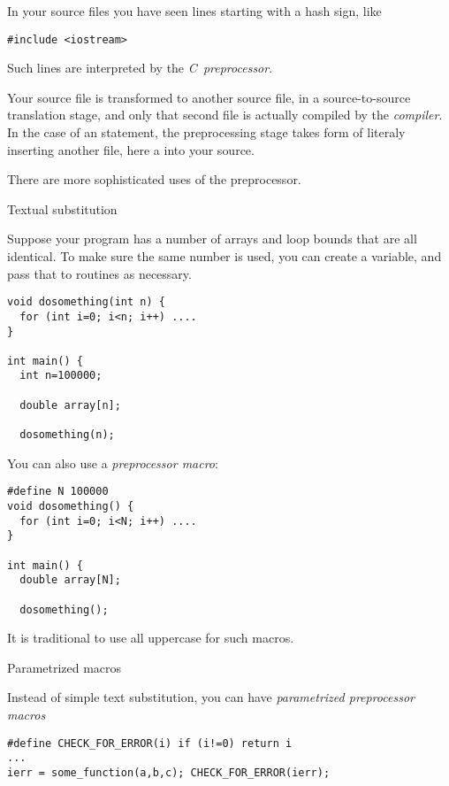 
In your source files you have seen lines starting with a hash sign,
like
\begin{lstlisting}
#include <iostream>
\end{lstlisting}
Such lines are interpreted by the
%
\emph{C~preprocessor}.

Your source file is transformed to another source file, in a
source-to-source translation stage, and only that second file is
actually compiled by the
%
\emph{compiler}.
In the case of an  statement, the preprocessing stage
takes form of literaly inserting another file, here a
%
into your source.

There are more sophisticated uses of the preprocessor.

 {Textual substitution}

Suppose your program has a number of arrays and loop bounds that are
all identical. To make sure the same number is used, you can create a
variable, and pass that to routines as necessary.
\begin{lstlisting}
void dosomething(int n) {
  for (int i=0; i<n; i++) ....
}

int main() {
  int n=100000;

  double array[n];
   
  dosomething(n);
\end{lstlisting}
You can also use a \emph{preprocessor macro}:
\begin{lstlisting}
#define N 100000
void dosomething() {
  for (int i=0; i<N; i++) ....
}

int main() {
  double array[N];
   
  dosomething();
\end{lstlisting}
It is traditional to use all uppercase for such macros.

 {Parametrized macros}

Instead of simple text substitution, you can have
%
\emph{parametrized preprocessor macros}
\begin{lstlisting}
#define CHECK_FOR_ERROR(i) if (i!=0) return i
...
ierr = some_function(a,b,c); CHECK_FOR_ERROR(ierr);
\end{lstlisting}

